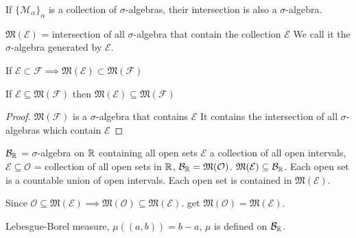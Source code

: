 If $\{\mathcal{M}_\alpha\}_{\alpha}$ is a collection of $\sigma$-algebras, their intersection is also a $\sigma$-algebra.

\begin{definition}
$\mathfrak{M}(\mathcal{E})$ = intersection of all $\sigma$-algebra that contain the collection $\mathcal{E}$
We call it the $\sigma$-algebra generated by $\mathcal{E}$.
\end{definition}

\begin{remark}
If $\mathcal{E}\subset \mathcal{F} \implies \mathfrak{M}(\mathcal{E}) \subset \mathfrak{M}(\mathcal{F})$
\end{remark}
\begin{lemma}
  If $\mathcal{E} \subseteq \mathfrak{M}(\mathcal{F})$ then $\mathfrak{M}(\mathcal{E}) \subseteq \mathfrak{M}(\mathcal{F})$
\end{lemma}
\begin{proof}
  $\mathfrak{M}(\mathcal{F})$ is a $\sigma$-algebra that contains $\mathcal{E}$
  It contains the intersection of all $\sigma$-algebras which contain $\mathcal{E}$
\end{proof}

\begin{example}
  $\mathcal{B}_\mathbb R$ = $\sigma$-algebra on $\mathbb R$ containing all open sets 
  $\mathcal{E}$ a collection of all open intervals, 
  $\mathcal{E}\subseteq\mathcal{O}$ = collection of all open sets in $\mathbb R$,
  $\mathcal{B}_\mathbb R = \mathfrak{M}(\mathcal{O})$. $\mathfrak{M}(\mathcal{E}) \subseteq \mathcal{B}_\mathbb R$.
  Each open set is a countable union of open intervals. Each open set is contained in $\mathfrak{M}(\mathcal{E})$.
  
  Since $\mathcal{O} \subseteq \mathfrak{M}(\mathcal{E}) \implies \mathfrak{M}(\mathcal{O}) \subseteq \mathfrak{M}(\mathcal{E})$.
  get $\mathfrak{M}(\mathcal{O}) = \mathfrak{M}(\mathcal{E})$.
\end{example}

Lebesgue-Borel measure,
$\mu((a, b)) = b-a$, $\mu$ is defined on $\mathcal{B}_\mathbb R$.